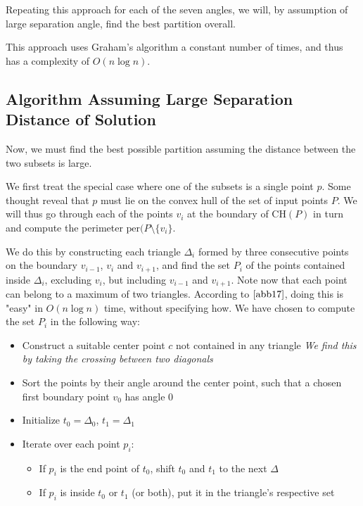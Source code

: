\documentclass{article}
\begin{document}
Repeating this approach for each of the seven angles, we will, by assumption of large separation angle, find the best partition overall.

This approach uses Graham's algorithm a constant number of times, and thus has a complexity of $O(n \log n)$.

\subsection{Algorithm Assuming Large Separation Distance of Solution}

Now, we must find the best possible partition assuming the distance between the two subsets is large. 

We first treat the special case where one of the subsets is a single point $p$. Some thought reveal that $p$ must lie on the convex hull of the set of input points $P$. We will thus go through each of the points $v_i$ at the boundary of $\text{CH}(P)$ in turn and compute the perimeter $\text{per}(P \setminus \{v_i\}$. 

We do this by constructing each triangle $\Delta_i$ formed by three consecutive points on the boundary $v_{i - 1}$, $v_i$ and $v_{i + 1}$, and find the set $P_i$ of the points contained inside $\Delta_i$, excluding $v_i$, but including $v_{i - 1}$ and $v_{i + 1}$. Note now that each point can belong to a maximum of two triangles. According to $\cite{abb17}$, doing this is "easy" in $O(n \log n)$ time, without specifying how. We have chosen to compute the set $P_i$ in the following way:
\begin{itemize}
    \item Construct a suitable center point $c$ not contained in any triangle \textit{We find this by taking the crossing between two diagonals}
    \item Sort the points by their angle around the center point, such that a chosen first boundary point $v_0$ has angle $0$
    \item Initialize $t_0 = \Delta_0$, $t_1 = \Delta_1$
    \item Iterate over each point $p_i$: \begin{itemize}
        \item If $p_i$ is the end point of $t_0$, shift $t_0$ and $t_1$ to the next $\Delta$
        \item If $p_i$ is inside $t_0$ or $t_1$ (or both), put it in the triangle's respective set
    \end{itemize}
\end{itemize}
\end{document}
